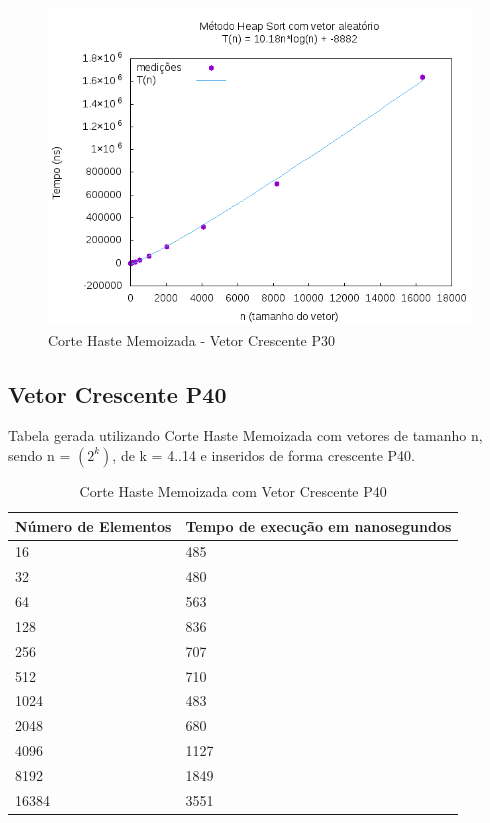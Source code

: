 \documentclass[12pt,a4paper,twoside]{report}
\begin{document}
\begin{figure}[H]
    \centering
    \includegraphics[width=0.7\linewidth]{graficos/HeapSort/vIntAleatorio/vIntAleatorio.png}
  \caption{Corte Haste Memoizada - Vetor Crescente P30}
\end{figure}





\subsection{Vetor Crescente P40}
Tabela gerada utilizando Corte Haste Memoizada com vetores de tamanho n, sendo n = $(2^k)$, de k = 4..14 e inseridos de forma crescente P40.
\begin{table}[H]
\centering
\caption{Corte Haste Memoizada com Vetor Crescente P40}
\label{my-label}
\begin{tabular}{|l|l|}
\hline
\multicolumn{1}{|c|}{\textbf{Número de Elementos}} & \multicolumn{1}{c|}{\textbf{Tempo de execução em nanosegundos}} \\ \hline
16 & 485 \\ \hline
32 & 480 \\ \hline
64 & 563 \\ \hline
128 & 836 \\ \hline
256 & 707 \\ \hline
512 & 710 \\ \hline
1024 & 483 \\ \hline
2048 & 680 \\ \hline
4096 & 1127 \\ \hline
8192 & 1849 \\ \hline
16384 & 3551 \\ \hline
\end{tabular}
\end{table}
\end{document}
